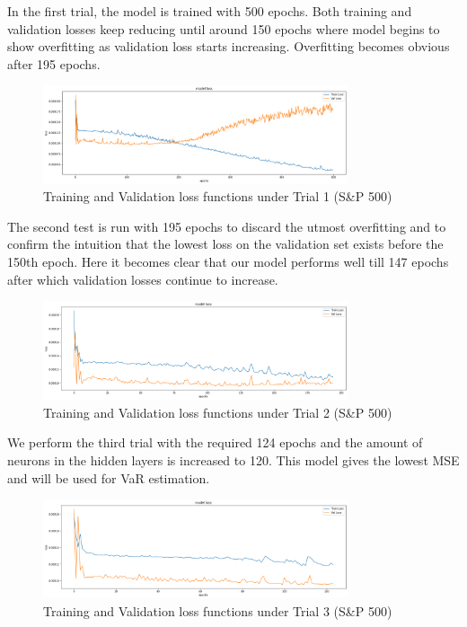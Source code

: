 \documentclass[a4paper,11pt,oneside]{book}
\begin{document}
In the first trial, the model is trained with 500 epochs. Both training and validation losses keep reducing until around 150 epochs where model begins to show overfitting as validation loss starts increasing. Overfitting becomes obvious after 195 epochs.\newline
\begin{figure}[!h]
	\centering
	\includegraphics[width=0.8\textwidth]{figures/sanp1}
	\caption{Training and Validation loss functions under Trial 1 (S\&P 500)}
	\label{sanp1}
\end{figure}
\newline The second test is run with 195 epochs to discard the utmost overfitting and to confirm the intuition that the lowest loss on the validation set exists
before the 150th epoch. Here it becomes clear that our model performs well till 147 epochs after which validation losses continue to increase.  
\begin{figure}[!h]
	\centering
	\includegraphics[width=0.8\textwidth]{figures/sanp2}
	\caption{Training and Validation loss functions under Trial 2 (S\&P 500)}
	\label{sanp2}
\end{figure}
\newline We perform the third trial with the required 124 epochs and the amount of neurons in the hidden layers is increased to 120. This model gives the lowest MSE and will be used for VaR estimation.\newline
\begin{figure}[!h]
	\centering
	\includegraphics[width=0.8\textwidth]{figures/sanp3}
	\caption{Training and Validation loss functions under Trial 3 (S\&P 500)}
	\label{sanp3}
\end{figure}
\end{document}
